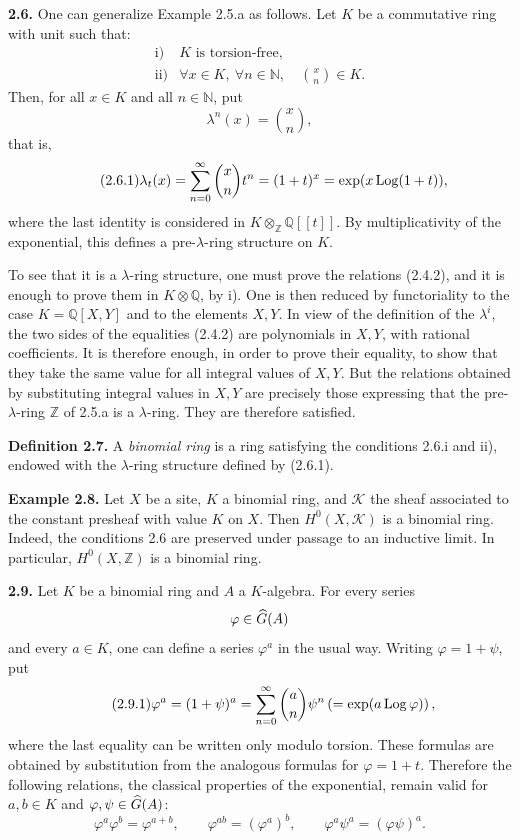 \documentclass[11pt]{article}
\begin{document}
\textbf{2.6.} One can generalize Example 2.5.a as follows. Let \(K\) be a commutative ring with unit such that:
\[
\begin{array}{ll}
\text{i)}& K\text{ is torsion-free},\\
\text{ii)}& \forall x\in K,\ \forall n\in\mathbb N,\quad \binom{x}{n}\in K .
\end{array}
\]
Then, for all \(x\in K\) and all \(n\in\mathbb N\), put
\[
  \lambda^n(x)=\binom{x}{n},
\]
that is,
\begin{equation}\tag{2.6.1}
  \lambda_t(x)=\sum_{n=0}^{\infty}\binom{x}{n}t^n
  =(1+t)^x=\exp(x\operatorname{Log}(1+t)),
\end{equation}
where the last identity is considered in \(K\otimes_{\mathbb Z}\mathbb Q[[t]]\). By multiplicativity of the exponential, this defines a pre-\(\lambda\)-ring structure on \(K\).

To see that it is a \(\lambda\)-ring structure, one must prove the relations (2.4.2), and it is enough to prove them in \(K\otimes\mathbb Q\), by i). One is then reduced by functoriality to the case \(K=\mathbb Q[X,Y]\) and to the elements \(X,Y\). In view of the definition of the \(\lambda^i\), the two sides of the equalities (2.4.2) are polynomials in \(X,Y\), with rational coefficients. It is therefore enough, in order to prove their equality, to show that they take the same value for all integral values of \(X,Y\). But the relations obtained by substituting integral values in \(X,Y\) are precisely those expressing that the pre-\(\lambda\)-ring \(\mathbb Z\) of 2.5.a is a \(\lambda\)-ring. They are therefore satisfied.

\textbf{Definition 2.7.} A \emph{binomial ring} is a ring satisfying the conditions 2.6.i and ii), endowed with the \(\lambda\)-ring structure defined by (2.6.1).

\textbf{Example 2.8.} Let \(X\) be a site, \(K\) a binomial ring, and \(\mathcal K\) the sheaf associated to the constant presheaf with value \(K\) on \(X\). Then \(H^0(X,\mathcal K)\) is a binomial ring. Indeed, the conditions 2.6 are preserved under passage to an inductive limit. In particular, \(H^0(X,\mathbb Z)\) is a binomial ring.

\textbf{2.9.} Let \(K\) be a binomial ring and \(A\) a \(K\)-algebra. For every series
\[
  \varphi\in\widehat G(A)
\]
and every \(a\in K\), one can define a series \(\varphi^a\) in the usual way. Writing \(\varphi=1+\psi\), put
\begin{equation}\tag{2.9.1}
  \varphi^a=(1+\psi)^a
  =
  \sum_{n=0}^{\infty}\binom{a}{n}\psi^n
  \left(=\exp(a\operatorname{Log}\varphi)\right),
\end{equation}
where the last equality can be written only modulo torsion. These formulas are obtained by substitution from the analogous formulas for \(\varphi=1+t\). Therefore the following relations, the classical properties of the exponential, remain valid for \(a,b\in K\) and \(\varphi,\psi\in\widehat G(A)\):
\begin{equation}\tag{2.9.2}
  \varphi^a\varphi^b=\varphi^{a+b},\qquad
  \varphi^{ab}=(\varphi^a)^b,\qquad
  \varphi^a\psi^a=(\varphi\psi)^a .
\end{equation}
\end{document}
